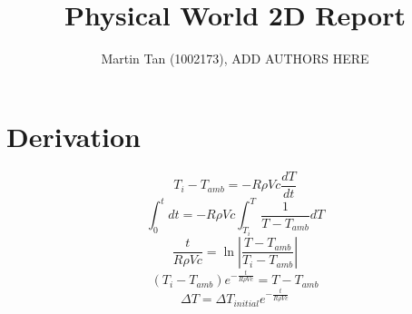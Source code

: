 \documentclass[12pt,a4paper]{IEEEtran}
\author{Martin Tan (1002173), ADD AUTHORS HERE}
\title{Physical World 2D Report}
\begin{document}
	\maketitle
	\section{Derivation}
	$$T_i - T_{amb} = -R \rho V c \frac{dT}{dt}$$
	$$\int_{0}^{t} dt = -R \rho V c \int_{T_i}^{T}\frac{1}{T-T_{amb}} dT$$
	$$\frac{t}{R \rho V c} = \ln \left| \frac{T - T_{amb}}{T_i - T_{amb}} \right|$$
	$$\left( T_i - T_{amb} \right) e^{-\frac{t}{R \rho V c}} = T - T_{amb}$$
	$$\Delta T = \Delta T_{initial} e^{-\frac{t}{R \rho V c}}$$
\end{document}

